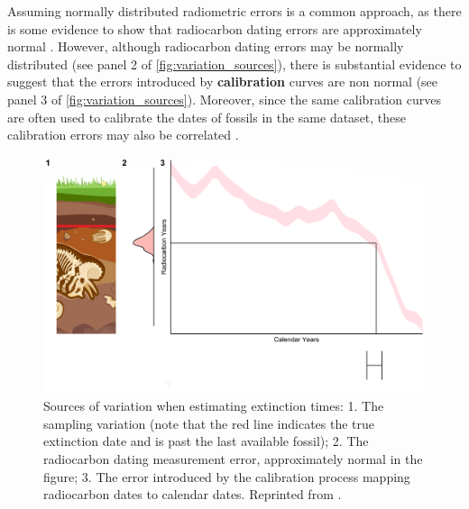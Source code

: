 Assuming normally distributed radiometric errors is a common approach, as there is some evidence to show that radiocarbon dating errors are approximately normal \cite{Walker2005Quaternary}. However, although radiocarbon dating errors may be normally distributed (see panel 2 of \autoref{fig:variation_sources}), there is substantial evidence to suggest that the errors introduced by \textbf{calibration} curves are non normal (see panel 3 of \autoref{fig:variation_sources}). Moreover, since the same calibration curves are often used to calibrate the dates of fossils in the same dataset, these calibration errors may also be correlated \cite{Ramsey2009, Ramsey2010, Ramsey2013}.
\begin{figure}[ht]
    \centering
    \includegraphics[width=0.7\linewidth]{figures/variation-sources-king.png}
    \caption{Sources of variation when estimating extinction times: 1. The sampling variation (note that the red line indicates the true extinction date and is past the last available fossil); 2. The radiocarbon dating measurement error, approximately normal in the figure; 3. The error introduced by the calibration process mapping radiocarbon dates to calendar dates. Reprinted from \citet{King2020}.}
    \label{fig:variation_sources}
\end{figure}
